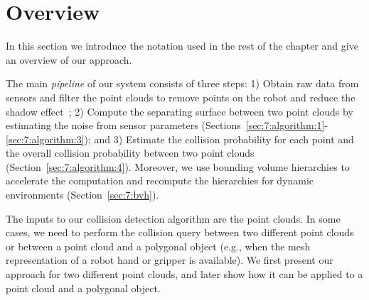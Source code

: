 \section{Overview}
\label{sec:7:overview}
In this section we introduce the notation used in the rest of the chapter and give an overview of our approach.

The main \emph{pipeline} of our system
consists of three steps: 1) Obtain raw data from sensors and filter the point clouds to remove points on the robot and reduce the shadow effect~\cite{Ioan:2010}; 2) Compute the separating surface between two point clouds by estimating the noise from sensor parameters (Sections~\ref{sec:7:algorithm:1}-\ref{sec:7:algorithm:3}); and 3) Estimate the collision probability for each point and the overall collision probability between two point clouds (Section~\ref{sec:7:algorithm:4}). Moreover, we use bounding volume hierarchies to accelerate the computation and recompute the hierarchies for dynamic environments (Section~\ref{sec:7:bvh}).

The inputs to our collision detection algorithm are the point clouds. In some cases, we need to perform
the collision query between two different point clouds or between a point cloud and a polygonal object (e.g., when the mesh representation of a robot hand or gripper is available). We first present our
approach for two different point clouds, and later show how it can be applied to a point cloud and a polygonal object.

